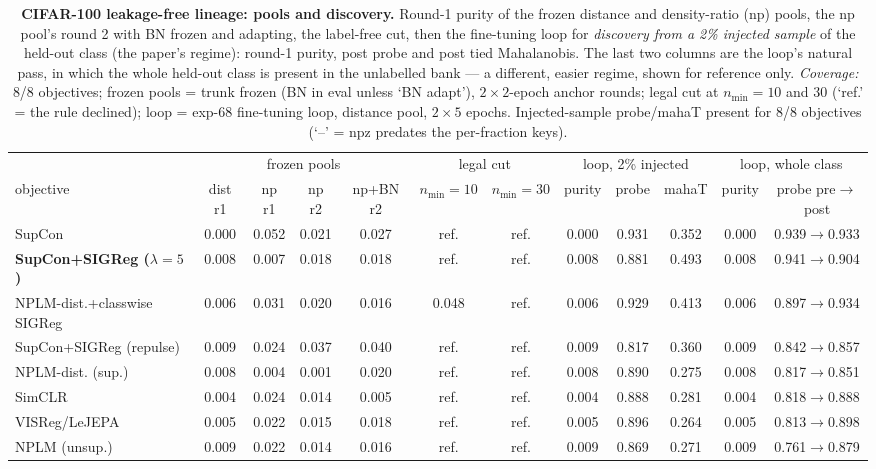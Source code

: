 \begin{landscape}
\begin{table}[p]
\centering
\footnotesize
\setlength{\tabcolsep}{3pt}
\begin{tabular}{lccccccccccc}
\toprule
& \multicolumn{4}{c}{frozen pools} & \multicolumn{2}{c}{legal cut} & \multicolumn{3}{c}{loop, 2\% injected} & \multicolumn{2}{c}{loop, whole class} \\
\cmidrule(lr){2-5}\cmidrule(lr){6-7}\cmidrule(lr){8-10}\cmidrule(lr){11-12}
objective & dist r1 & np r1 & np r2 & np+BN r2 & $n_{\min}{=}10$ & $n_{\min}{=}30$ & purity & probe & mahaT & purity & probe pre$\to$post \\
\midrule
SupCon & 0.000 & 0.052 & 0.021 & 0.027 & ref. & ref. & 0.000 & 0.931 & 0.352 & 0.000 & 0.939$\to$0.933 \\
\textbf{SupCon+SIGReg ($\lambda{=}5$)} & 0.008 & 0.007 & 0.018 & 0.018 & ref. & ref. & 0.008 & 0.881 & 0.493 & 0.008 & 0.941$\to$0.904 \\
NPLM-dist.+classwise SIGReg & 0.006 & 0.031 & 0.020 & 0.016 & 0.048 & ref. & 0.006 & 0.929 & 0.413 & 0.006 & 0.897$\to$0.934 \\
SupCon+SIGReg (repulse) & 0.009 & 0.024 & 0.037 & 0.040 & ref. & ref. & 0.009 & 0.817 & 0.360 & 0.009 & 0.842$\to$0.857 \\
NPLM-dist. (sup.) & 0.008 & 0.004 & 0.001 & 0.020 & ref. & ref. & 0.008 & 0.890 & 0.275 & 0.008 & 0.817$\to$0.851 \\
SimCLR & 0.004 & 0.024 & 0.014 & 0.005 & ref. & ref. & 0.004 & 0.888 & 0.281 & 0.004 & 0.818$\to$0.888 \\
VISReg/LeJEPA & 0.005 & 0.022 & 0.015 & 0.018 & ref. & ref. & 0.005 & 0.896 & 0.264 & 0.005 & 0.813$\to$0.898 \\
NPLM (unsup.) & 0.009 & 0.022 & 0.014 & 0.016 & ref. & ref. & 0.009 & 0.869 & 0.271 & 0.009 & 0.761$\to$0.879 \\
\bottomrule
\end{tabular}
\caption{\textbf{CIFAR-100 leakage-free lineage: pools and discovery.} Round-1 purity of the frozen distance and density-ratio (np) pools, the np pool's round 2 with BN frozen and adapting, the label-free cut, then the fine-tuning loop for \emph{discovery from a 2\% injected sample} of the held-out class (the paper's regime): round-1 purity, post probe and post tied Mahalanobis. The last two columns are the loop's natural pass, in which the whole held-out class is present in the unlabelled bank --- a different, easier regime, shown for reference only. \emph{Coverage:} 8/8 objectives; frozen pools = trunk frozen (BN in eval unless `BN adapt'), $2\times2$-epoch anchor rounds; legal cut at $n_{\min}=10$ and $30$ (`ref.' = the rule declined); loop = exp-68 fine-tuning loop, distance pool, $2\times5$ epochs. Injected-sample probe/mahaT present for 8/8 objectives (`--' = npz predates the per-fraction keys).}

\end{table}
\end{landscape}
